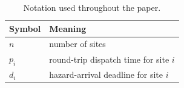 \documentclass[pdflatex,sn-mathphys-ay]{sn-jnl}
\theoremstyle{thmstyleone}
\theoremstyle{thmstyletwo}
\theoremstyle{thmstylethree}
\providecommand{\DIFaddbeginFL}{} %
\providecommand{\DIFdelbeginFL}{} %
\providecommand{\DIFdelendFL}{} %
\newcommand{\DIFscaledelfig}{0.5}
\newlength{\DIFdelgraphicswidth} %
\newlength{\DIFdelgraphicsheight} %
\newcommand{\DIFaddincludegraphics}[2][]{{\color{blue}\fbox{\DIFOincludegraphics[#1]{#2}}}} %
\newcommand{\DIFdelincludegraphics}[2][]{%
\sbox{\DIFdelgraphicsbox}{\DIFOincludegraphics[#1]{#2}}%
\settoboxwidth{\DIFdelgraphicswidth}{\DIFdelgraphicsbox} %
\settoboxtotalheight{\DIFdelgraphicsheight}{\DIFdelgraphicsbox} %
\scalebox{\DIFscaledelfig}{%
\parbox[b]{\DIFdelgraphicswidth}{\usebox{\DIFdelgraphicsbox}\\[-\baselineskip] \rule{\DIFdelgraphicswidth}{0em}}\llap{\resizebox{\DIFdelgraphicswidth}{\DIFdelgraphicsheight}{%
\setlength{\unitlength}{\DIFdelgraphicswidth}%
\begin{picture}(1,1)%
\thicklines\linethickness{2pt} %
{\color[rgb]{1,0,0}\put(0,0){\framebox(1,1){}}}%
{\color[rgb]{1,0,0}\put(0,0){\line( 1,1){1}}}%
{\color[rgb]{1,0,0}\put(0,1){\line(1,-1){1}}}%
\end{picture}%
}\hspace*{3pt}}} %
} %
\DeclareRobustCommand{\DIFaddbeginFL}{\DIFOaddbeginFL \let\includegraphics\DIFaddincludegraphics} %
\DeclareRobustCommand{\DIFdelbeginFL}{\DIFOdelbeginFL \let\includegraphics\DIFdelincludegraphics} %
\DeclareRobustCommand{\DIFdelendFL}{\DIFOaddendFL \let\includegraphics\DIFOincludegraphics} %
\begin{document}
\begin{table}[h]
\caption{Notation used throughout the paper.}\label{tab:notation}
\DIFdelbeginFL %
\DIFdelendFL \DIFaddbeginFL \begin{tabular}{@{}ll@{}}
\toprule
Symbol & Meaning \\
\midrule
$n$ & number of sites \\
$p_i$ & round-trip dispatch time for site $i$ \\
$d_i$ & hazard-arrival deadline for site $i$ \\

\end{tabular}
\end{table}
\end{document}
